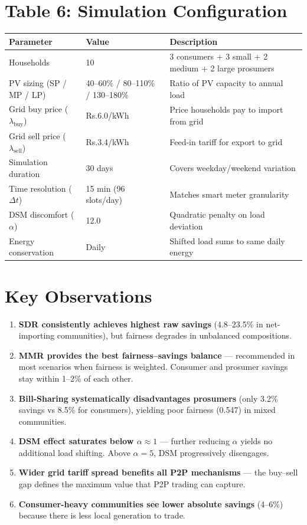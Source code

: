 \documentclass[12pt]{article}
\newcommand{\Rs}{Rs.}
\begin{document}
\section*{Table 6: Simulation Configuration}

\begin{table}[h!]
\centering
\renewcommand{\arraystretch}{1.3}
\small
\begin{tabular}{p{4cm} p{4.5cm} p{7.5cm}}
\toprule
\textbf{Parameter} & \textbf{Value} & \textbf{Description} \\
\midrule
Households & 10 & 3 consumers + 3 small + 2 medium + 2 large prosumers \\
PV sizing (SP / MP / LP) & 40--60\% / 80--110\% / 130--180\% & Ratio of PV capacity to annual load \\
Grid buy price ($\lambda_\text{buy}$) & \Rs 6.0/kWh & Price households pay to import from grid \\
Grid sell price ($\lambda_\text{sell}$) & \Rs 3.4/kWh & Feed-in tariff for export to grid \\
Simulation duration & 30 days & Covers weekday/weekend variation \\
Time resolution ($\Delta t$) & 15 min (96 slots/day) & Matches smart meter granularity \\
DSM discomfort ($\alpha$) & 12.0 & Quadratic penalty on load deviation \\
Energy conservation & Daily & Shifted load sums to same daily energy \\
\bottomrule
\end{tabular}
\end{table}

\section*{Key Observations}

\begin{enumerate}
\item \textbf{SDR consistently achieves highest raw savings} (4.8--23.5\% in net-importing communities), but fairness degrades in unbalanced compositions.
\item \textbf{MMR provides the best fairness--savings balance} --- recommended in most scenarios when fairness is weighted. Consumer and prosumer savings stay within 1--2\% of each other.
\item \textbf{Bill-Sharing systematically disadvantages prosumers} (only 3.2\% savings vs 8.5\% for consumers), yielding poor fairness (0.547) in mixed communities.
\item \textbf{DSM effect saturates below $\alpha \approx 1$} --- further reducing $\alpha$ yields no additional load shifting. Above $\alpha = 5$, DSM progressively disengages.
\item \textbf{Wider grid tariff spread benefits all P2P mechanisms} --- the buy--sell gap defines the maximum value that P2P trading can capture.
\item \textbf{Consumer-heavy communities see lower absolute savings} (4--6\%) because there is less local generation to trade.
\end{enumerate}
\end{document}
